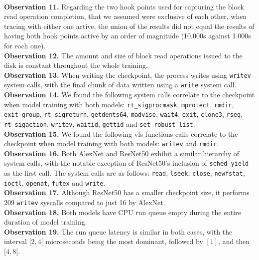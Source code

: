 \documentclass[conference]{IEEEtran}
\begin{document}
\\
\textbf{Observation 11.} Regarding the two hook points used for capturing the block read operation completion, that we assumed were exclusive of each other, when tracing with either one active, the union of the results did not equal the results of having both hook points active by an order of magnitude (10.000s against 1.000s for each one).
\\
\textbf{Observation 12.} The amount and size of block read operations issued to the disk is constant throughout the whole training.
\\
\textbf{Observation 13.} When writing the checkpoint, the process writes using \texttt{writev} system calls, with the final chunk of data written using a \texttt{write} system call.
\\
\textbf{Observation 14.} We found the following system calls correlate to the checkpoint when model training with both models: \texttt{rt\_sigprocmask}, \texttt{mprotect}, \texttt{rmdir}, \texttt{exit\_group}, \texttt{rt\_sigreturn}, \texttt{getdents64}, \texttt{madvise}, \texttt{wait4}, \texttt{exit}, \texttt{clone3}, \texttt{rseq}, \texttt{rt\_sigaction}, \texttt{writev}, \texttt{waitid}, \texttt{gettid} and \texttt{set\_robust\_list}.
\\
\textbf{Observation 15.} We found the following vfs functions calls correlate to the checkpoint when model training with both models: \texttt{writev} and \texttt{rmdir}.
\\
\textbf{Observation 16.} Both AlexNet and ResNet50 exhibit a similar hierarchy of system calls, with the notable exception of ResNet50's inclusion of \texttt{sched\_yield} as the first call. The system calls are as follows: \texttt{read}, \texttt{lseek}, \texttt{close}, \texttt{newfstat}, \texttt{ioctl}, \texttt{openat}, \texttt{futex} and \texttt{write}.
\\
\textbf{Observation 17.} Although ResNet50 has a smaller checkpoint size, it performs 209 \texttt{writev} syscalls compared to just 16 by AlexNet.
\\
\textbf{Observation 18.} Both models have CPU run queue empty during the entire duration of model training.
\\
\textbf{Observation 19.} The run queue latency is similar in both cases, with the interval \([2, 4[\) microseconds being the most dominant, followed by \([1]\), and then \([4, 8[\).
\end{document}
